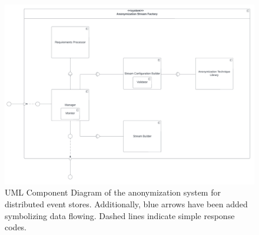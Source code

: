 \begin{figure}[ht]
    \begin{adjustbox}{center}
    \includegraphics[width=0.8\pdfpagewidth]{img/Anon_Factory_Component_Diagram.pdf}
    \end{adjustbox}
    \caption{UML Component Diagram of the anonymization system for distributed event stores. Additionally, blue arrows have been added symbolizing data flowing. Dashed lines indicate simple response codes. \label{fig:anon_fac_component}}
\end{figure}

